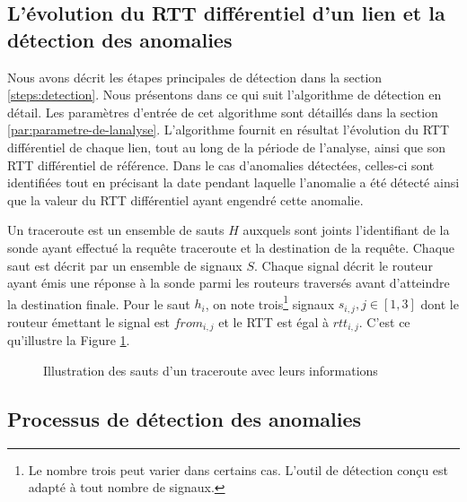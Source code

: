 \subsection{L'évolution du RTT différentiel d'un lien et  la détection des anomalies} \label{rttevolution}

Nous avons décrit les étapes principales de détection dans la section \ref{steps:detection}. Nous  présentons dans ce qui suit  l'algorithme de détection en détail. Les paramètres d'entrée  de cet algorithme sont détaillés dans la section \ref{par:parametre-de-lanalyse}. L'algorithme fournit en résultat l'évolution du RTT différentiel de chaque lien, tout au long de la période de l'analyse, ainsi que son RTT différentiel de référence. Dans le cas d'anomalies détectées, celles-ci sont identifiées tout en précisant la date pendant laquelle l'anomalie a été détecté ainsi que la valeur du RTT différentiel ayant engendré cette anomalie. 

Un traceroute  est un ensemble de sauts $H$ auxquels sont joints l'identifiant de la sonde ayant effectué la requête traceroute et la destination de la requête. Chaque saut est décrit par un ensemble de signaux $S$.  Chaque signal décrit le routeur ayant émis une réponse à la sonde parmi les routeurs traversés avant d'atteindre la destination finale.  Pour le saut $h_i$, on note trois\footnote{Le nombre trois peut varier dans certains cas. L'outil de détection conçu est adapté à tout nombre de signaux.} signaux $s_{i, j},  j\in [1,3]$ dont le routeur émettant le signal est $from_{i,j}$ et le RTT est égal à $rtt_{i,j}$. C'est ce qu'illustre  la Figure \ref{fig:traceroute}.

\begin{figure}[H]
	\centering
	\captionsetup{justification=centering}
	\resizebox{\textwidth}{!}{
	
}
	\caption{Illustration des sauts d'un traceroute avec leurs informations}
	\label{fig:traceroute}
\end{figure}

%	 
\subsection{Processus de  détection des anomalies }\label{steps-rtt-analysis}

